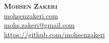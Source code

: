 \documentclass[A4,11pt]{article}
\begin{document}

\begin{minipage}[c]{0.4\textwidth}
    \textbf{\Huge \scshape{Mohsen Zakeri}} \\ 
    \href{https://www.mohsenzakeri.com}{mohsenzakeri.com} \\
    \href{mailto:mohs.zakeri@gmail.com}{mohs.zakeri@gmail.com} \\
    \href{https://github.com/mohsenzakeri}{https://github.com/mohsenzakeri}
\end{minipage}

\end{document}
